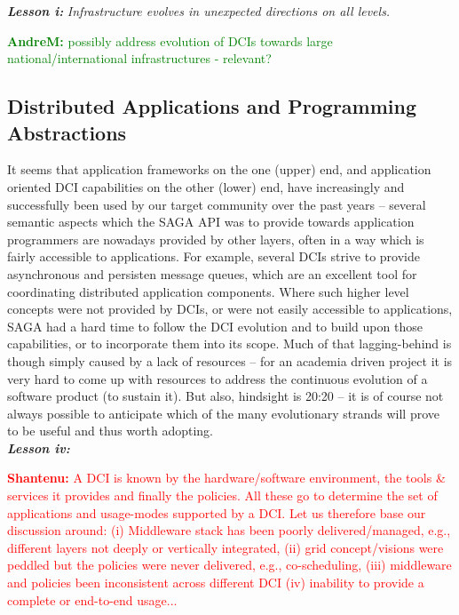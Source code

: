 \documentclass{article}
\newcommand{\I}[1]{\textit{#1}}
\newcommand{\B}[1]{\textbf{#1}}
\newcommand{\BI}[1]{\textbf{\textit{#1}}}
\newcommand{\jhanote}[1]{{\textcolor{red}{     \B{Shantenu:} #1 }}}
\newcommand{\amnote}[1]{{\textcolor{green}{   \B{AndreM:  } #1 }}}
\newcommand{\jhanote}[1]{}
\newcommand{\amnote}[1]{}
\begin{document}
  \BI{Lesson i:} \I{Infrastructure evolves in unexpected directions  on all
  levels.}

  \amnote{possibly address evolution of DCIs towards large
  national/international infrastructures - relevant?}


 \subsection{Distributed Applications and Programming Abstractions}

  It seems that application frameworks on the one (upper) end, and
  application oriented DCI capabilities on the other (lower) end, have
  increasingly and successfully been used by our target community over
  the past years -- several semantic aspects which the SAGA API was to
  provide towards application programmers are nowadays provided by other
  layers, often in a way which is fairly accessible to applications.
  For example, several DCIs strive to provide asynchronous and persisten
  message queues, which are an excellent tool for coordinating
  distributed application components.  Where such higher level concepts
  were not provided by DCIs, or were not easily accessible to
  applications, SAGA had a hard time to follow the DCI evolution and to
  build upon those capabilities, or to incorporate them into its scope.
  Much of that lagging-behind is though simply caused by a lack of
  resources -- for an academia driven project it is very hard to come up
  with resources to address the continuous evolution of a software
  product (to sustain it).  But also, hindsight is 20:20 -- it is of
  course not always possible to anticipate which of the many
  evolutionary strands will prove to be useful and thus worth
  adopting.\\
  \BI{Lesson iv:} 


  \jhanote{A DCI is known by the hardware/software environment, the
  tools \& services it provides and finally the policies. All these go
  to determine the set of applications and usage-modes supported by
  a DCI. Let us therefore base our discussion around: (i) Middleware
  stack has been poorly delivered/managed, e.g., different layers not
  deeply or vertically integrated, (ii) grid concept/visions were
  peddled but the policies were never delivered, e.g., co-scheduling,
  (iii) middleware and policies been inconsistent across different DCI
  (iv) inability to provide a complete or end-to-end usage...}
  
\end{document}

